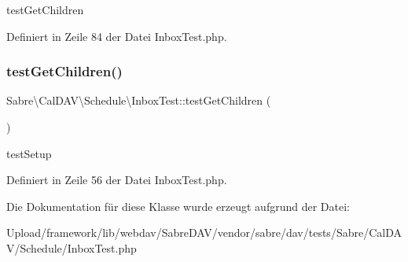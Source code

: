 test\+Get\+Children 

Definiert in Zeile 84 der Datei Inbox\+Test.\+php.

\mbox{\label{class_sabre_1_1_cal_d_a_v_1_1_schedule_1_1_inbox_test_a3194d36cb3d9376a31d69a22ac730663}} 
\subsubsection{\texorpdfstring{test\+Get\+Children()}{testGetChildren()}}
{\footnotesize\ttfamily Sabre\textbackslash{}\+Cal\+D\+A\+V\textbackslash{}\+Schedule\textbackslash{}\+Inbox\+Test\+::test\+Get\+Children (\begin{DoxyParamCaption}{ }\end{DoxyParamCaption})}

test\+Setup 

Definiert in Zeile 56 der Datei Inbox\+Test.\+php.



Die Dokumentation für diese Klasse wurde erzeugt aufgrund der Datei\+:\begin{DoxyCompactItemize}
\item 
Upload/framework/lib/webdav/\+Sabre\+D\+A\+V/vendor/sabre/dav/tests/\+Sabre/\+Cal\+D\+A\+V/\+Schedule/Inbox\+Test.\+php\end{DoxyCompactItemize}
